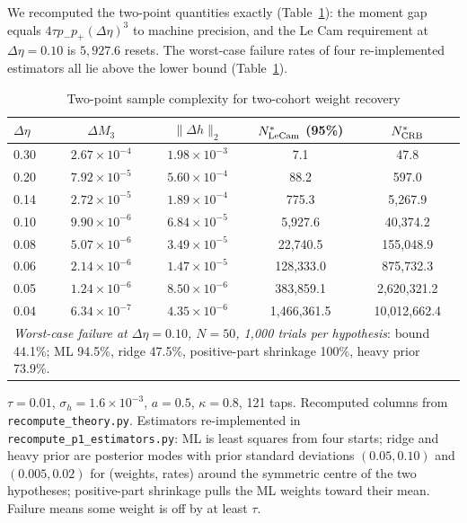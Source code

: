 \begin{theorem}[Global two-point bound and matching upper bound, $K=2$]
\begin{enumerate}[label=(\roman*)]
\end{enumerate}
\end{theorem}

We recomputed the two-point quantities exactly (Table~\ref{p1:tab:lecam}): the moment gap equals $4\tau p_-p_+(\Delta\eta)^3$ to machine precision, and the Le Cam requirement at $\Delta\eta=0.10$ is $5{,}927.6$ resets. The worst-case failure rates of four re-implemented estimators all lie above the lower bound (Table~\ref{p1:tab:lecam}).

\begin{table}[t]\centering\small
\begin{threeparttable}
\caption{Two-point sample complexity for two-cohort weight recovery}\label{p1:tab:lecam}
\begin{tabular}{lcccc}
\toprule
$\Delta\eta$ & $\Delta M_3$ & $\|\Delta h\|_2$ & $N^*_{\rm LeCam}$ (95\%) & $N^*_{\rm CRB}$\\
\midrule
0.30 & $2.67\times10^{-4}$ & $1.98\times10^{-3}$ & 7.1 & 47.8\\
0.20 & $7.92\times10^{-5}$ & $5.60\times10^{-4}$ & 88.2 & 597.0\\
0.14 & $2.72\times10^{-5}$ & $1.89\times10^{-4}$ & 775.3 & 5{,}267.9\\
0.10 & $9.90\times10^{-6}$ & $6.84\times10^{-5}$ & 5{,}927.6 & 40{,}374.2\\
0.08 & $5.07\times10^{-6}$ & $3.49\times10^{-5}$ & 22{,}740.5 & 155{,}048.9\\
0.06 & $2.14\times10^{-6}$ & $1.47\times10^{-5}$ & 128{,}333.0 & 875{,}732.3\\
0.05 & $1.24\times10^{-6}$ & $8.50\times10^{-6}$ & 383{,}859.1 & 2{,}620{,}321.2\\
0.04 & $6.34\times10^{-7}$ & $4.35\times10^{-6}$ & 1{,}466{,}361.5 & 10{,}012{,}662.4\\
\midrule
\multicolumn{5}{p{0.85\textwidth}}{\emph{Worst-case failure at $\Delta\eta=0.10$, $N=50$, 1,000 trials per hypothesis}: bound 44.1\%; ML 94.5\%, ridge 47.5\%, positive-part shrinkage 100\%, heavy prior 73.9\%.}\\
\bottomrule
\end{tabular}
\begin{tablenotes}\footnotesize\item $\tau=0.01$, $\sigma_h=1.6\times10^{-3}$, $a=0.5$, $\kappa=0.8$, 121 taps. Recomputed columns from \texttt{recompute\_theory.py}. Estimators re-implemented in \texttt{recompute\_p1\_estimators.py}: ML is least squares from four starts; ridge and heavy prior are posterior modes with prior standard deviations $(0.05,0.10)$ and $(0.005,0.02)$ for (weights, rates) around the symmetric centre of the two hypotheses; positive-part shrinkage pulls the ML weights toward their mean. Failure means some weight is off by at least $\tau$.\end{tablenotes}
\end{threeparttable}
\end{table}

